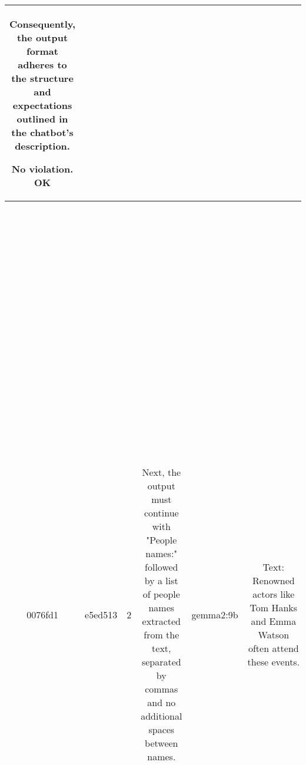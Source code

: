 \begin{table}[h!]
\begin{tabular}{|c|c|c|c|c|c|c|c|c|c|}
Consequently, the output format adheres to the structure and expectations outlined in the chatbot's description.

No violation.
OK & \\
\hline
0076fd1 & e5ed513 & 2 & Next, the output must continue with "People names:" followed by a list of people names extracted from the text, separated by commas and no additional spaces between names. & gemma2:9b & Text: Renowned actors like Tom Hanks and Emma Watson often attend these events. & Here are the entities extracted from the text you provided:

**Company names:**  

**People names:** Tom Hanks, Emma Watson 
**Specific topics:** Actors, Events 
**General themes:** Celebrities, Entertainment Industry



Let me know if you have any other text you'd like me to analyze! 
 & err & The chatbot output is missing the "Company names" section, as there is no list after the section header. The guidelines clearly state that the output should include a comma-separated list or a placeholder for company names, even if the list is empty. Additionally, the people names, specific topics, and general themes sections are appropriately listed with headings and comma-separated values as required.

Nevertheless, because of the missing or non-compliant "Company names" section, which does not follow the format specified in the description, this output violates the description rules.

ERR & \\
\hline
99f4286 & e5ed513 & 2 & Next, the output must continue with "People names:" followed by a list of people names extracted from the text, separated by commas and no additional spaces between names. & gemma2:9b & Text: Inspirational leaders such as Elon Musk and Ariana Huffington continue to innovate. & Company names:  
People names: Elon Musk, Ariana Huffington 
Specific topics: Innovation, Leadership
General themes:  Inspiration, Disruptors, Future of Industry 


Let me know if you'd like me to analyze any other text! 
 & err & The chatbot output does not comply with the description provided. Firstly, while it provides lists for people names, specific topics, and general themes, the field for company names is blank while the description specifies it should be a comma-separated list. Even if there was no company name in the input, indicating "None" or a similar placeholder would have sufficed to comply with the specified format. Additionally, the description does not include any provision for an additional text like "Let me know if you'd like me to analyze any other text!" after the structured data output. This extra sentence deviates from the desired format outlined in the description.


\end{tabular}
\end{table}
